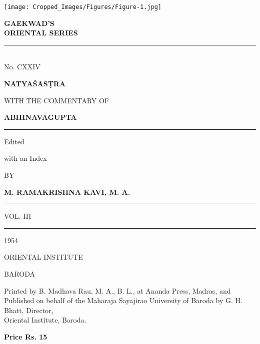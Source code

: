 \documentclass[11pt, openany]{book}
\begin{document}
\cfoot{}

\vspace*{\fill}

\begin{center}
\texttt{[image: Cropped\_Images/Figures/Figure-1.jpg]}
\end{center}

\begin{mdframed}
\begin{center}
\textbf{\LARGE GAEKWAD'S}\\

\vspace{3mm}
\textbf{\LARGE ORIENTAL SERIES}\\

\vspace{3mm}
\rule{0.2\linewidth}{0.5pt}\\

\vspace{3mm}
{\Large No. CXXIV}
\end{center}
\end{mdframed}

\vspace*{\fill}

\newpage
\begin{center}
\textbf{\huge NĀTYAŚĀSṬRA}

\vspace{5mm}
WITH THE COMMENTARY OF

\vspace{5mm}
\textbf{\LARGE ABHINAVAGUPTA}

\vspace{3mm}
\rule{0.2\linewidth}{0.5pt}

\vfil
Edited

with an Index

\vspace{2mm}
BY

\vspace{2mm}
\textbf{M. RAMAKRISHNA KAVI, M. A.}

\rule{0.2\linewidth}{0.5pt}

VOL. III

\rule{0.2\linewidth}{0.5pt}

\vfil
1954

\vspace{2mm}
ORIENTAL INSTITUTE

BARODA
\end{center}

\newpage
\vspace*{\fill}
\begin{center}
Printed by B. Madhava Rau, M. A., B. L., at Ananda Press, Madras, and Published on behalf of the Maharaja Sayajirao University of Baroda by G. H. Bhatt, Director,\\
Oriental Institute, Baroda.

\vspace{5mm}
\textbf{Price Rs. 15}
\end{center}
\end{document}
